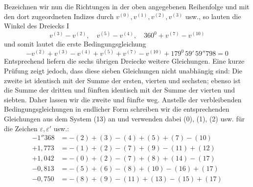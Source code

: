 Bezeichnen wir nun die Richtungen in der oben angegebenen Reihenfolge und mit den dort zugeordneten Indizes durch \(v^{(0)},v^{(1)},v^{(2)},v^{(3)}\) usw., so lauten die Winkel des Dreiecks I
\[
v^{(3)}-v^{(2)},\quad v^{(5)}-v^{(4)},\quad 360^0+v^{(7)}-v^{(10)}
\]
und somit lautet die erste Bedingungsgleichung
\[
-v^{(2)}+v^{(3)}-v^{(4)}+v^{(5)}+v^{(7)}-v^{(10)}+179^0\,59'\,59''798=0
\]
Entsprechend liefern die sechs übrigen Dreiecke weitere Gleichungen. Eine kurze Prüfung zeigt jedoch, dass diese sieben Gleichungen nicht unabhängig sind: Die zweite ist identisch mit der Summe der ersten, vierten und sechsten; ebenso ist die Summe der dritten und fünften identisch mit der Summe der vierten und siebten. Daher lassen wir die zweite und fünfte weg. Anstelle der verbleibenden Bedingungsgleichungen in endlicher Form schreiben wir die entsprechenden Gleichungen aus dem System (13) an und verwenden dabei (0), (1), (2) usw. für die Zeichen \(\varepsilon,\varepsilon'\) usw.:
\[
\begin{aligned}
-1''368&=-(2)+(3)-(4)+(5)+(7)-(10)\\
+1{,}773&=-(1)+(2)-(7)+(9)-(11)+(12)\\
+1{,}042&=-(0)+(2)-(7)+(8)+(14)-(17)\\
-0{,}813&=-(5)+(6)-(8)+(10)-(16)+(17)\\
-0{,}750&=-(8)+(9)-(11)+(13)-(15)+(17)
\end{aligned}
\]

